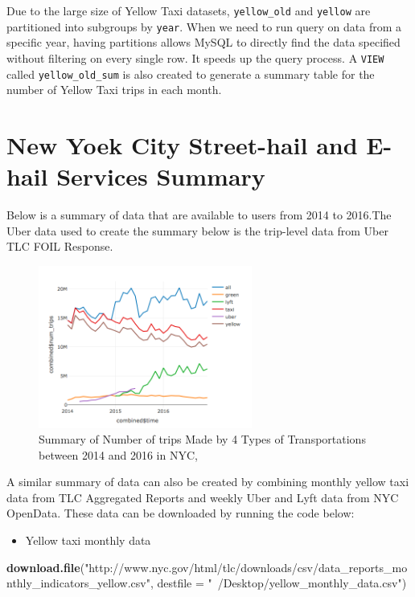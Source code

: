 \documentclass[12pt,twoside]{reedthesis}
\newenvironment{Shaded}{\begin{snugshade}}{\end{snugshade}}
\newcommand{\KeywordTok}[1]{\textcolor[rgb]{0.13,0.29,0.53}{\textbf{#1}}}
\newcommand{\DataTypeTok}[1]{\textcolor[rgb]{0.13,0.29,0.53}{#1}}
\newcommand{\StringTok}[1]{\textcolor[rgb]{0.31,0.60,0.02}{#1}}
\newcommand{\NormalTok}[1]{#1}
\providecommand{\tightlist}{%
  \setlength{\itemsep}{0pt}\setlength{\parskip}{0pt}}
\theoremstyle{definition}
\theoremstyle{definition}
\theoremstyle{definition}
\theoremstyle{remark}
\begin{document}
Due to the large size of Yellow Taxi datasets, \texttt{yellow\_old} and
\texttt{yellow} are partitioned into subgroups by \texttt{year}. When we
need to run query on data from a specific year, having partitions allows
MySQL to directly find the data specified without filtering on every
single row. It speeds up the query process. A \texttt{VIEW} called
\texttt{yellow\_old\_sum} is also created to generate a summary table
for the number of Yellow Taxi trips in each month.

\section{New Yoek City Street-hail and E-hail Services
Summary}\label{new-yoek-city-street-hail-and-e-hail-services-summary}

Below is a summary of data that are available to users from 2014 to
2016.The Uber data used to create the summary below is the trip-level
data from Uber TLC FOIL Response.
\begin{figure}

{\centering \includegraphics[width=2.76in]{figure/Num_trips_summary} 

}

\caption{Summary of Number of trips Made by 4 Types of Transportations between 2014 and 2016 in NYC, }\label{fig:num-trips-summary}
\end{figure}
A similar summary of data can also be created by combining monthly
yellow taxi data from TLC Aggregated Reports and weekly Uber and Lyft
data from NYC OpenData. These data can be downloaded by running the code
below:
\begin{itemize}
\tightlist
\item
  Yellow taxi monthly data
\end{itemize}
\begin{Shaded}
\begin{Highlighting}[]
\KeywordTok{download.file}\NormalTok{(}\StringTok{"http://www.nyc.gov/html/tlc/downloads/csv/data_reports_monthly_indicators_yellow.csv"}\NormalTok{, }
    \DataTypeTok{destfile =} \StringTok{"~/Desktop/yellow_monthly_data.csv"}\NormalTok{)}
\end{Highlighting}
\end{Shaded}
\end{document}
